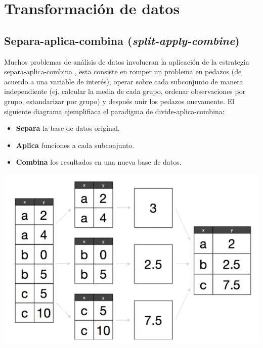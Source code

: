 \documentclass[
]{book}
\providecommand{\tightlist}{%
  \setlength{\itemsep}{0pt}\setlength{\parskip}{0pt}}
\begin{document}
\hypertarget{transformaciuxf3n-de-datos}{%
\section{Transformación de datos}\label{transformaciuxf3n-de-datos}}

\hypertarget{separa-aplica-combina-split-apply-combine}{%
\subsection*{\texorpdfstring{Separa-aplica-combina (\emph{split-apply-combine})}{Separa-aplica-combina (split-apply-combine)}}\label{separa-aplica-combina-split-apply-combine}}

Muchos problemas de análisis de datos involucran la aplicación de la estrategia
separa-aplica-combina \citep{plyr},
esta consiste en romper un problema en pedazos (de
acuerdo a una variable de interés), operar sobre cada subconjunto de manera
independiente (ej. calcular la media de cada grupo, ordenar observaciones por
grupo, estandarizar por grupo) y después unir los pedazos nuevamente. El
siguiente diagrama ejemplifiaca el paradigma de divide-aplica-combina:

\begin{itemize}
\tightlist
\item
  \textbf{Separa} la base de datos original.\\
\item
  \textbf{Aplica} funciones a cada subconjunto.\\
\item
  \textbf{Combina} los resultados en una nueva base de datos.
\end{itemize}

\includegraphics{imagenes/split-apply-combine.png}
\end{document}
